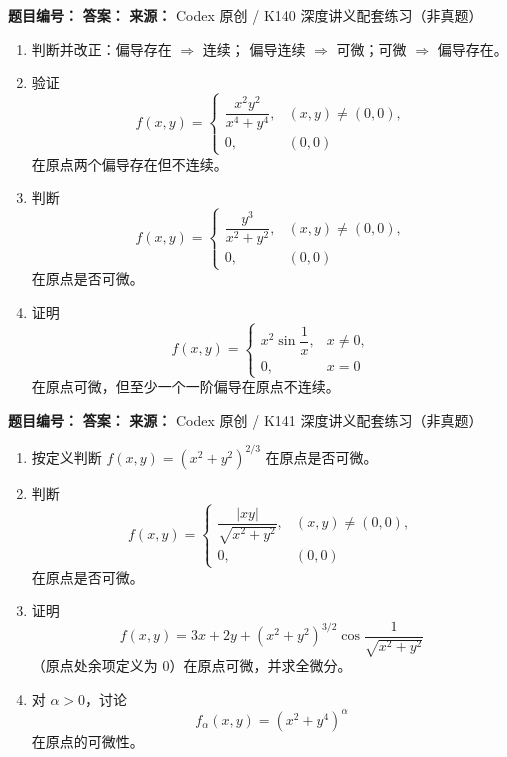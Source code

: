 \begin{problemBox}
\begin{problemMeta}
\textbf{题目编号：}  \quad
\textbf{答案：}  \quad
\textbf{来源：} Codex 原创 / K140 深度讲义配套练习（非真题）
\end{problemMeta}
\begin{enumerate}
\item[\textbf{A}] 判断并改正：偏导存在 \(\Rightarrow\) 连续；
偏导连续 \(\Rightarrow\) 可微；可微 \(\Rightarrow\) 偏导存在。
\item[\textbf{B}] 验证
\[
f(x,y)=
\begin{cases}
\dfrac{x^2y^2}{x^4+y^4},&(x,y)\ne(0,0),\\0,&(0,0)
\end{cases}
\]
在原点两个偏导存在但不连续。
\item[\textbf{C}] 判断
\[
f(x,y)=
\begin{cases}
\dfrac{y^3}{x^2+y^2},&(x,y)\ne(0,0),\\0,&(0,0)
\end{cases}
\]
在原点是否可微。
\item[\textbf{M}] 证明
\[
f(x,y)=
\begin{cases}
x^2\sin\!\dfrac1x,&x\ne0,\\0,&x=0
\end{cases}
\]
在原点可微，但至少一个一阶偏导在原点不连续。
\end{enumerate}
\end{problemBox}

\begin{problemBox}
\begin{problemMeta}
\textbf{题目编号：}  \quad
\textbf{答案：}  \quad
\textbf{来源：} Codex 原创 / K141 深度讲义配套练习（非真题）
\end{problemMeta}
\begin{enumerate}
\item[\textbf{A}] 按定义判断 \(f(x,y)=(x^2+y^2)^{2/3}\) 在原点是否可微。
\item[\textbf{B}] 判断
\[
f(x,y)=
\begin{cases}
\dfrac{|xy|}{\sqrt{x^2+y^2}},&(x,y)\ne(0,0),\\0,&(0,0)
\end{cases}
\]
在原点是否可微。
\item[\textbf{C}] 证明
\[
f(x,y)=3x+2y+(x^2+y^2)^{3/2}\cos\!\frac1{\sqrt{x^2+y^2}}
\]
（原点处余项定义为 \(0\)）在原点可微，并求全微分。
\item[\textbf{M}] 对 \(\alpha>0\)，讨论
\[
f_\alpha(x,y)=(x^2+y^4)^\alpha
\]
在原点的可微性。
\end{enumerate}
\end{problemBox}

